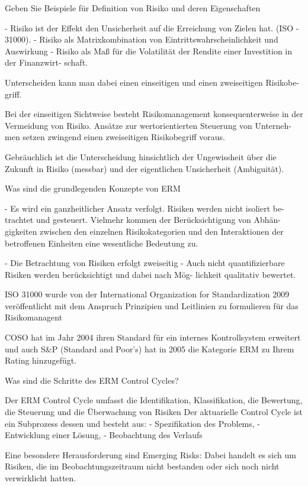 Geben Sie Beispiele für Definition von Risiko und deren Eigenschaften

- Risiko ist der Effekt den Unsicherheit auf die Erreichung von Zielen hat. (ISO - 31000).
- Risiko als Matrixkombination von Eintrittswahrscheinlichkeit und Auswirkung
- Risiko als Maß für die Volatilität der Rendite einer Investition in der Finanzwirt-
schaft.

Unterscheiden kann man dabei einen einseitigen und einen zweiseitigen Risikobe-
griff.

Bei der einseitigen Sichtweise besteht Risikomanagement konsequenterweise in
der Vermeidung von Risiko. Ansätze zur wertorientierten Steuerung von Unterneh-
men setzen zwingend einen zweiseitigen Risikobegriff voraus.

Gebräuchlich ist die Unterscheidung hinsichtlich der Ungewissheit über die Zukunft
in Risiko (messbar) und der eigentlichen Unsicherheit (Ambiguität).


Was sind die grundlegenden Konzepte von ERM

- Es wird ein ganzheitlicher Ansatz verfolgt. Risiken werden nicht isoliert be-
trachtet und gesteuert. Vielmehr kommen der Berücksichtigung von Abhän-
gigkeiten zwischen den einzelnen Risikokategorien und den Interaktionen der
betroffenen Einheiten eine wesentliche Bedeutung zu.

- Die Betrachtung von Risiken erfolgt zweiseitig
- Auch nicht quantifizierbare Risiken werden berücksichtigt und dabei nach Mög-
lichkeit qualitativ bewertet.

ISO 31000 wurde von der International Organization for Standardization
2009 veröffentlicht mit dem Anspruch Prinzipien und Leitlinien zu formulieren für
das Risikomanagent

COSO hat im Jahr 2004 ihren Standard für ein internes Kontrollsystem erweitert
und auch S\&P (Standard and Poor's) hat in 2005 die Kategorie ERM zu Ihrem Rating hinzugefügt.


Was sind die Schritte des ERM Control Cycles?

Der ERM Control Cycle umfasst die Identifikation, Klassifikation, 
die Bewertung, die Steuerung und die Überwachung von Risiken
Der aktuarielle Control Cycle ist ein Subprozess dessen und besteht aus:
- Spezifikation des Problems,
- Entwicklung einer Lösung,
- Beobachtung des Verlaufs

Eine besondere Herausforderung sind Emerging Risks: 
Dabei handelt es sich um Risiken, die im Beobachtungszeitraum nicht bestanden
oder sich noch nicht verwirklicht hatten.

